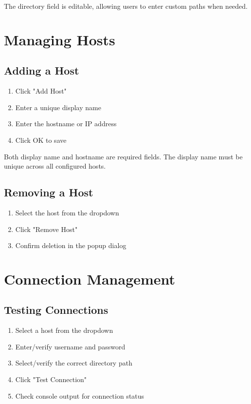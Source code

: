 \documentclass[a4paper,11pt]{report}
\begin{document}
\begin{notebox}
The directory field is editable, allowing users to enter custom paths when needed.
\end{notebox}

\section{Managing Hosts}

\subsection{Adding a Host}
\begin{procedurebox}
\begin{enumerate}
    \item Click "Add Host"
    \item Enter a unique display name
    \item Enter the hostname or IP address
    \item Click OK to save
\end{enumerate}
\end{procedurebox}

\begin{warningbox}
Both display name and hostname are required fields. The display name must be unique across all configured hosts.
\end{warningbox}

\subsection{Removing a Host}
\begin{procedurebox}
\begin{enumerate}
    \item Select the host from the dropdown
    \item Click "Remove Host"
    \item Confirm deletion in the popup dialog
\end{enumerate}
\end{procedurebox}

\section{Connection Management}

\subsection{Testing Connections}
\begin{procedurebox}
\begin{enumerate}
    \item Select a host from the dropdown
    \item Enter/verify username and password
    \item Select/verify the correct directory path
    \item Click "Test Connection"
    \item Check console output for connection status
\end{enumerate}
\end{procedurebox}
\end{document}
